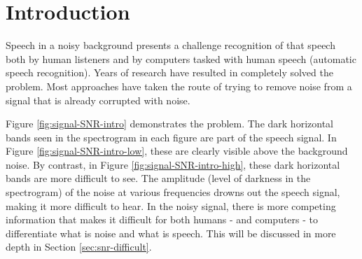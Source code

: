 % 
% 
% 

\chapter{Introduction\label{chapter1}}

Speech in a noisy background presents a challenge \DIFdelbegin {}\DIFdelend \DIFaddbegin {}\DIFaddend recognition of that speech both by human listeners and by computers tasked with \DIFdelbegin {}\DIFdelend \DIFaddbegin {}\DIFaddend human speech (\DIFdelbegin {}\DIFdelend automatic speech recognition\DIFaddbegin {}\DIFaddend ).  Years of research have resulted in \DIFdelbegin {}\DIFdelend \DIFaddbegin {}\DIFaddend completely solved the problem.  Most approaches have taken the route of trying to remove noise from a signal that is already corrupted with noise.

Figure \ref{fig:signal-SNR-intro} demonstrates the problem.  The dark horizontal bands seen in the spectrogram in each figure are part of the speech signal.  In Figure \ref{fig:signal-SNR-intro-low}, these are clearly visible above the background noise.  By contrast, in Figure \ref{fig:signal-SNR-intro-high}, these dark horizontal bands are more difficult to see.  The amplitude (level of darkness in the spectrogram) of the noise at various frequencies drowns out the speech signal, making it more difficult to hear.  In the noisy signal, there is more competing information that makes it difficult for both humans - and computers - to differentiate what is noise and what is speech.  This will be discussed in more depth in Section \ref{sec:snr-difficult}.

